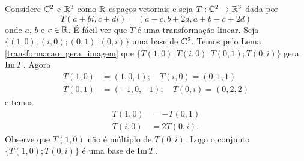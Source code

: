 \begin{exemplo}
  Considere $\mathbb{C}^2$ e $\mathbb{R}^3$ como $\mathbb{R}$-espa\c{c}os vetoriais e seja $T : \mathbb{C}^2 \to \mathbb{R}^3$ dada por
  \[
    T(a+bi, c+di) = (a - c, b + 2d, a + b - c + 2d)
  \]
  onde $a$, $b$ e $c \in \mathbb{R}$. \'E f\'acil ver que $T$ \'e uma transforma\c{c}\~ao linear. Seja $\{(1,0);(i,0);(0,1);(0,i)\}$ uma base de $\mathbb{C}^2$. Temos pelo Lema \ref{transformacao_gera_imagem} que $\{T(1,0);T(i,0);T(0,1);T(0,i)\}$ gera ${\rm Im\,} T$. Agora
  \begin{align*}
    T(1,0) &= (1,0,1);\quad T(i,0) = (0,1,1)\\
    T(0,1) &= (-1,0,-1);\quad T(0,i) = (0,2,2)
  \end{align*}
  e temos
  \begin{align*}
    T(1,0) &= -T(0,1)\\
    T(i,0) &= 2T(0,i).
  \end{align*}
  Observe que $T(1,0)$ n\~ao \'e m\'ultiplo de $T(0,i)$. Logo o conjunto $\{T(1,0); T(0,i)\}$ \'e uma base de ${\rm Im\,} T$.
\end{exemplo}


